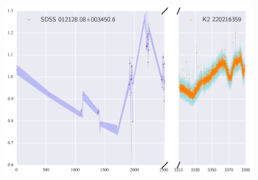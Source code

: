 \documentclass[a4paper,fleqn,usenatbib]{mnras}
\begin{document}
        	\begin{figure}
        		\includegraphics[width=\columnwidth]{220216359ExtendedLC.png}
        		\caption{}
        		\label{fig:example_figure}
        	\end{figure}   
        	
         
\end{document}
